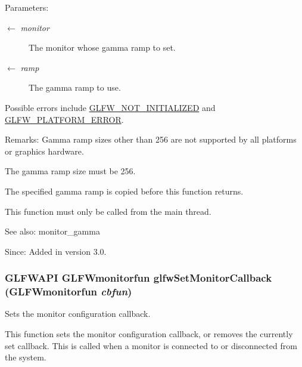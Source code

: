 \begin{Desc}
\item[Parameters:]
\begin{description}
\item[\mbox{$\leftarrow$} {\em monitor}]The monitor whose gamma ramp to set. \item[\mbox{$\leftarrow$} {\em ramp}]The gamma ramp to use.\end{description}
\end{Desc}
Possible errors include \hyperlink{group__errors_g2374ee02c177f12e1fa76ff3ed15e14a}{GLFW\_\-NOT\_\-INITIALIZED} and \hyperlink{group__errors_gd44162d78100ea5e87cdd38426b8c7a1}{GLFW\_\-PLATFORM\_\-ERROR}.

\begin{Desc}
\item[Remarks:]Gamma ramp sizes other than 256 are not supported by all platforms or graphics hardware.

The gamma ramp size must be 256.\end{Desc}
The specified gamma ramp is copied before this function returns.

This function must only be called from the main thread.

\begin{Desc}
\item[See also:]monitor\_\-gamma\end{Desc}
\begin{Desc}
\item[Since:]Added in version 3.0. \end{Desc}
\hypertarget{group__monitor_gcfa9978e57c73670577d530df23bf275}{
\subsubsection[glfwSetMonitorCallback]{\setlength{\rightskip}{0pt plus 5cm}GLFWAPI {\bf GLFWmonitorfun} glfwSetMonitorCallback ({\bf GLFWmonitorfun} {\em cbfun})}}
\label{group__monitor_gcfa9978e57c73670577d530df23bf275}


Sets the monitor configuration callback. 

This function sets the monitor configuration callback, or removes the currently set callback. This is called when a monitor is connected to or disconnected from the system.

